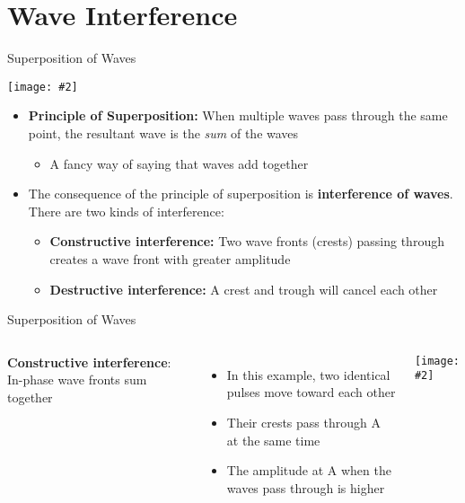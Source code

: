 \documentclass[12pt,aspectratio=169]{beamer}
\newcommand{\pic}[2]{\texttt{[image: \#2]}}
\begin{document}
\section[Interference]{Wave Interference}

\begin{frame}{Superposition of Waves}
  \begin{center}
    \pic{.6}{omkAt}
  \end{center}
  \begin{itemize}
  \item\textbf{Principle of Superposition:} When multiple waves pass through
    the same point, the resultant wave is the \emph{sum} of the waves
    \begin{itemize}
    \item A fancy way of saying that waves add together
    \end{itemize}
  \item The consequence of the principle of superposition is
    \textbf{interference of waves}. There are two kinds of interference:
    \begin{itemize}
    \item\textbf{Constructive interference:} Two wave fronts (crests) passing
      through creates a wave front with greater amplitude
    \item\textbf{Destructive interference:} A crest and trough will cancel
      each other
    \end{itemize}
  \end{itemize}
\end{frame}



\begin{frame}{Superposition of Waves}
  \begin{columns}
    \textbf{Constructive interference}: In-phase wave fronts sum together
    \begin{itemize}
    \item In this example, two identical pulses move toward each other
    \item Their crests pass through A at the same time
    \item The amplitude at A when the waves pass through is higher 
    \end{itemize}
    
    \pic1{constructive}
  \end{columns}
\end{frame}
\end{document}

